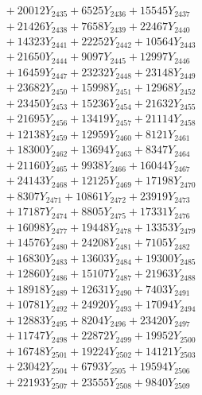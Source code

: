 \documentclass[a4paper,10pt]{article}
\begin{document}
{\begin{align}
&\;  + 20012 Y_{2435} + 6525 Y_{2436} + 15545 Y_{2437} \\[0.3ex]
&\;  + 21426 Y_{2438} + 7658 Y_{2439} + 22467 Y_{2440} \\[0.3ex]
&\;  + 14323 Y_{2441} + 22252 Y_{2442} + 10564 Y_{2443} \\[0.3ex]
&\;  + 21650 Y_{2444} + 9097 Y_{2445} + 12997 Y_{2446} \\[0.3ex]
&\;  + 16459 Y_{2447} + 23232 Y_{2448} + 23148 Y_{2449} \\[0.3ex]
&\;  + 23682 Y_{2450} + 15998 Y_{2451} + 12968 Y_{2452} \\[0.3ex]
&\;  + 23450 Y_{2453} + 15236 Y_{2454} + 21632 Y_{2455} \\[0.3ex]
&\;  + 21695 Y_{2456} + 13419 Y_{2457} + 21114 Y_{2458} \\[0.5ex]\allowbreak
&\;  + 12138 Y_{2459} + 12959 Y_{2460} + 8121 Y_{2461} \\[0.3ex]
&\;  + 18300 Y_{2462} + 13694 Y_{2463} + 8347 Y_{2464} \\[0.3ex]
&\;  + 21160 Y_{2465} + 9938 Y_{2466} + 16044 Y_{2467} \\[0.3ex]
&\;  + 24143 Y_{2468} + 12125 Y_{2469} + 17198 Y_{2470} \\[0.3ex]
&\;  + 8307 Y_{2471} + 10861 Y_{2472} + 23919 Y_{2473} \\[0.3ex]
&\;  + 17187 Y_{2474} + 8805 Y_{2475} + 17331 Y_{2476} \\[0.3ex]
&\;  + 16098 Y_{2477} + 19448 Y_{2478} + 13353 Y_{2479} \\[0.3ex]
&\;  + 14576 Y_{2480} + 24208 Y_{2481} + 7105 Y_{2482} \\[0.3ex]
&\;  + 16830 Y_{2483} + 13603 Y_{2484} + 19300 Y_{2485} \\[0.3ex]
&\;  + 12860 Y_{2486} + 15107 Y_{2487} + 21963 Y_{2488} \\[0.5ex]\allowbreak
&\;  + 18918 Y_{2489} + 12631 Y_{2490} + 7403 Y_{2491} \\[0.3ex]
&\;  + 10781 Y_{2492} + 24920 Y_{2493} + 17094 Y_{2494} \\[0.3ex]
&\;  + 12883 Y_{2495} + 8204 Y_{2496} + 23420 Y_{2497} \\[0.3ex]
&\;  + 11747 Y_{2498} + 22872 Y_{2499} + 19952 Y_{2500} \\[0.3ex]
&\;  + 16748 Y_{2501} + 19224 Y_{2502} + 14121 Y_{2503} \\[0.3ex]
&\;  + 23042 Y_{2504} + 6793 Y_{2505} + 19594 Y_{2506} \\[0.3ex]
&\;  + 22193 Y_{2507} + 23555 Y_{2508} + 9840 Y_{2509} \\[0.3ex]

\end{align}}
\end{document}
